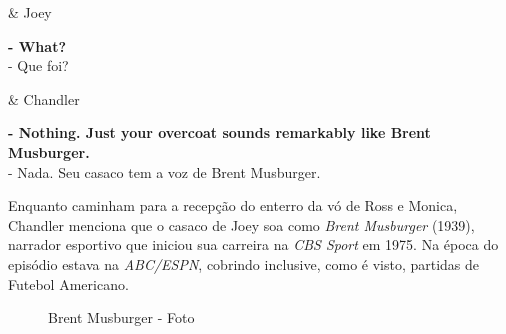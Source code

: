 \begin{tcolorbox}[enhanced,center upper,
    drop fuzzy shadow southeast, boxrule=0.3pt,
    lower separated=false,
    colframe=black!30!dialogoBorder,colback=white]
\begin{minipage}[c]{0.14\linewidth}
   & \centering \scriptsize{Joey}
\end{minipage}
\hspace{.1mm}
\begin{minipage}[c]{0.8\linewidth}
  \textbf{- What?}\\
  - Que foi?
\end{minipage}

\medskip
\begin{minipage}[c]{0.14\linewidth}
   & \centering \scriptsize{Chandler}
\end{minipage}
\hspace{.1mm}
\begin{minipage}[c]{0.8\linewidth}
  \textbf{- Nothing. Just your overcoat sounds remarkably like Brent Musburger.}\\
  - Nada. Seu casaco tem a voz de Brent Musburger.
\end{minipage}
\end{tcolorbox}

Enquanto caminham para a recepção do enterro da vó de Ross e Monica,
Chandler menciona que o casaco de Joey soa como \emph{Brent Musburger}
(1939), narrador esportivo que iniciou sua carreira na \emph{CBS Sport}
em 1975. Na época do episódio estava na \emph{ABC/ESPN}, cobrindo
inclusive, como é visto, partidas de Futebol Americano.

\begin{figure}
  \centering
    \caption{Brent Musburger - Foto\label{fig:brent-musburger-foto}}
\end{figure}

